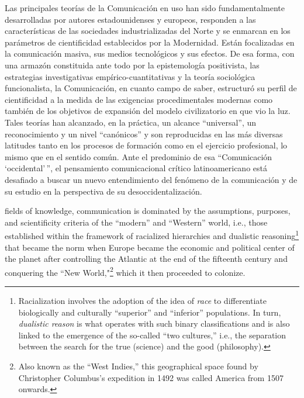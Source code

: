 \documentclass{tufte-handout}
\begin{document}
\begin{titlepage}
Las principales teorías de la Comunicación en uso han sido
fundamentalmente desarrolladas por autores estadounidenses y europeos,
responden a las características de las sociedades industrializadas del
Norte y se enmarcan en los parámetros de cientificidad establecidos por
la Modernidad. Están focalizadas en la comunicación masiva, sus medios
tecnológicos y sus efectos. De esa forma, con una armazón constituida
ante todo por la epistemología positivista, las estrategias
investigativas empírico-cuantitativas y la teoría sociológica
funcionalista, la Comunicación, en cuanto campo de saber, estructuró su
perfil de cientificidad a la medida de las exigencias procedimentales
modernas como también de los objetivos de expansión del modelo
civilizatorio en que vio la luz. Tales teorías han alcanzado, en la
práctica, un alcance ``universal'', un reconocimiento y un nivel
``canónicos'' y son reproducidas en las más diversas latitudes tanto en
los procesos de formación como en el ejercicio profesional, lo mismo que
en el sentido común. Ante el predominio de esa ``Comunicación
`occidental'\,'', el pensamiento comunicacional crítico latinoamericano
está desafiado a buscar un nuevo entendimiento del fenómeno de la
comunicación y de su estudio en la perspectiva de su
desoccidentalización.


\enlargethispage{2\baselineskip}




 \end{titlepage}


 fields of knowledge, communication is dominated by
the assumptions, purposes, and scientificity criteria of the ``modern''
and ``Western'' world, i.e., those established within the framework of
racialized hierarchies and dualistic reasoning\footnote{Racialization
  involves the adoption of the idea of \emph{race} to differentiate
  biologically and culturally ``superior'' and ``inferior'' populations.
  In turn, \emph{dualistic reason} is what operates with such binary
  classifications and is also linked to the emergence of the so-called
  ``two cultures,'' i.e., the separation between the search for the true
  (science) and the good (philosophy).} that became the norm when Europe
became the economic and political center of the planet after controlling
the Atlantic at the end of the fifteenth century and conquering the
``New World,"\footnote{Also known as the ``West Indies,'' this
  geographical space found by Christopher Columbus's expedition in 1492
  was called America from 1507 onwards.} which it then proceeded to
colonize.
\end{document}
